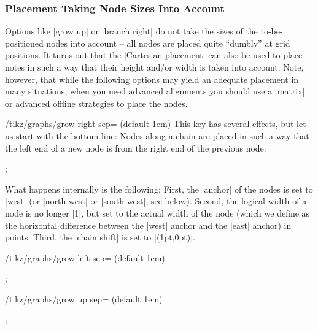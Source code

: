 \subsubsection{Placement Taking Node Sizes Into Account}

Options like |grow up| or |branch right| do not take the sizes of the
to-be-positioned nodes into account -- all nodes are placed quite ``dumbly'' at
grid positions. It turns out that the |Cartesian placement| can also be used to
place notes in such a way that their height and/or width is taken into account.
Note, however, that while the following options may yield an adequate placement
in many situations, when you need advanced alignments you should use a |matrix|
or advanced offline strategies to place the nodes.

\begin{key}{/tikz/graphs/grow right sep= (default 1em)}
    This key has several effects, but let us start with the bottom line: Nodes
    along a chain are placed in such a way that the left end of a new node is
     from the right end of the previous node:
\begin{codeexample}[preamble={\usetikzlibrary{graphs}}]
\tikz {};
\end{codeexample}
    What happens internally is the following: First, the |anchor| of the nodes
    is set to |west| (or |north west| or |south west|, see below). Second, the
    logical width of a node is no longer |1|, but set to the actual width of
    the node (which we define as the horizontal difference between the |west|
    anchor and the |east| anchor) in points. Third, the |chain shift| is set to
    |(1pt,0pt)|.
\end{key}

\begin{key}{/tikz/graphs/grow left sep= (default 1em)}
%
\begin{codeexample}[preamble={\usetikzlibrary{graphs}}]
\tikz {};
\end{codeexample}
%
\end{key}

\begin{key}{/tikz/graphs/grow up sep= (default 1em)}
%
\begin{codeexample}[preamble={\usetikzlibrary{graphs}}]
\tikz {};
\end{codeexample}
%
\end{key}

